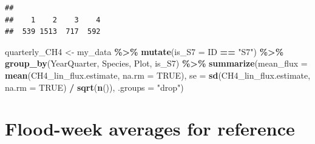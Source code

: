 \documentclass[
]{article}
\newenvironment{Shaded}{\begin{snugshade}}{\end{snugshade}}
\newcommand{\AttributeTok}[1]{\textcolor[rgb]{0.13,0.29,0.53}{#1}}
\newcommand{\ConstantTok}[1]{\textcolor[rgb]{0.56,0.35,0.01}{#1}}
\newcommand{\DecValTok}[1]{\textcolor[rgb]{0.00,0.00,0.81}{#1}}
\newcommand{\FunctionTok}[1]{\textcolor[rgb]{0.13,0.29,0.53}{\textbf{#1}}}
\newcommand{\NormalTok}[1]{#1}
\newcommand{\OtherTok}[1]{\textcolor[rgb]{0.56,0.35,0.01}{#1}}
\newcommand{\SpecialCharTok}[1]{\textcolor[rgb]{0.81,0.36,0.00}{\textbf{#1}}}
\newcommand{\StringTok}[1]{\textcolor[rgb]{0.31,0.60,0.02}{#1}}
\begin{document}
\begin{Shaded}
\end{Shaded}

\begin{verbatim}
## 
##    1    2    3    4 
##  539 1513  717  592
\end{verbatim}

\begin{Shaded}
\begin{Highlighting}[]
\NormalTok{quarterly\_CH4 }\OtherTok{\textless{}{-}}\NormalTok{ my\_data }\SpecialCharTok{\%\textgreater{}\%}
  \FunctionTok{mutate}\NormalTok{(}\AttributeTok{is\_S7 =}\NormalTok{ ID }\SpecialCharTok{==} \StringTok{"S7"}\NormalTok{) }\SpecialCharTok{\%\textgreater{}\%}
  \FunctionTok{group\_by}\NormalTok{(YearQuarter, Species, Plot, is\_S7) }\SpecialCharTok{\%\textgreater{}\%}
  \FunctionTok{summarize}\NormalTok{(}\AttributeTok{mean\_flux =} \FunctionTok{mean}\NormalTok{(CH4\_lin\_flux.estimate, }\AttributeTok{na.rm =} \ConstantTok{TRUE}\NormalTok{),}
            \AttributeTok{se =} \FunctionTok{sd}\NormalTok{(CH4\_lin\_flux.estimate, }\AttributeTok{na.rm =} \ConstantTok{TRUE}\NormalTok{) }\SpecialCharTok{/} \FunctionTok{sqrt}\NormalTok{(}\FunctionTok{n}\NormalTok{()), }\AttributeTok{.groups =} \StringTok{"drop"}\NormalTok{)}
\end{Highlighting}
\end{Shaded}

\section{Flood-week averages for
reference}\label{flood-week-averages-for-reference}
\end{document}

